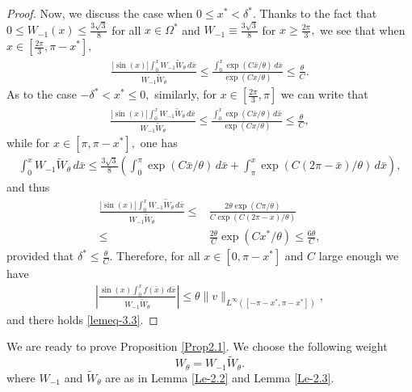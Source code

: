 \documentclass[12pt]{amsart}
\numberwithin{equation}{section}
\numberwithin{equation}{section}
\begin{document}
\begin{proof}
Now, we discuss the case  when  $0\leq x^*<\delta^*.$ Thanks to  the fact that $0\leq W_{-1}(x)\leq \frac{3\sqrt{3}}{8}$ for all $x\in\Omega^*$ and $W_{-1}\equiv  \frac{3\sqrt{3}}{8}$ for $x\geq \frac{2\pi}{3},$     we see that  when $x\in[\frac{2\pi}{3}, \pi-x^*],$ 
     \begin{align*}
    \frac{ |\sin (x)| \int_0^x W_{-1} \widetilde{W}_\theta \,d\bar x}{W_{-1} \widetilde{W}_\theta}\leq
\frac{\int_0^x  \exp(C\bar x/\theta)\,d\bar x}{\exp(C x/\theta)}\leq \frac{\theta}{C}.
 \end{align*}
As to the case $-\delta^*<x^*\leq0,$  similarly,  for $x\in[\frac{2\pi}{3}, \pi]$ we can write that
 \begin{align*}
    \frac{ |\sin (x)| \int_0^x W_{-1} \widetilde{W}_\theta \,d\bar x}{W_{-1} \widetilde{W}_\theta}\leq
\frac{\int_0^x  \exp(C\bar x/\theta)\,d\bar x}{\exp(C x/\theta)}\leq \frac{\theta}{C},
 \end{align*}
while for $x\in [\pi, \pi-x^*],$ one has 
  \begin{align*}
      \int_0^x W_{-1} \widetilde{W}_\theta \,d\bar x\leq  \frac{3\sqrt{3}}{8}\left(  \int_0^\pi\exp(C\bar x/\theta)\,d\bar x +  \int_\pi^x \exp(C(2\pi-\bar x)/\theta)\,d\bar x\right),
       \end{align*}
and thus
\begin{align*}
    \frac{ |\sin (x)| \int_0^x W_{-1} \widetilde{W}_\theta \,d\bar x}{W_{-1} \widetilde{W}_\theta}\leq&
 \frac{2\theta \exp(C\pi/\theta)}{C\exp(C(2\pi-x)/\theta)}\\
\leq& \frac{2\theta}{C}\exp(Cx^*/\theta)\leq \frac{6\theta}{C},
 \end{align*}
 provided that $\delta^*\leq \frac{\theta}{C}.$
 Therefore, for all $x\in[0, \pi-x^*]$ and $C$ large enough we have 
 \begin{align*}
\left|\frac{\sin ( x) \int_0^{x}f(\bar x)\,d\bar x}{W_{-1}\widetilde W_\theta}\right|\leq \theta \|v\|_{L^\infty([-\pi-x^*, \pi-x^*])},
 \end{align*}
and there holds \eqref{lemeq-3.3}.
 \end{proof}
 
\bigskip

We are ready to prove Proposition \ref{Prop2.1}. We choose the following weight
 \begin{equation} \label{id:def-Wtheta}
 W_\theta=W_{-1}\widetilde W_\theta.
 \end{equation}
where $W_{-1}$ and $\widetilde{W}_{\theta}$ are as in Lemma \ref{Le-2.2} and Lemma \ref{Le-2.3}.
\end{document}
